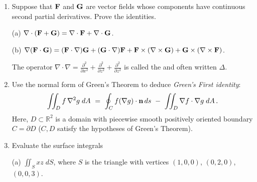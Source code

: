 \documentclass[12pt]{article}
\newcommand{\bfF}{{\bf F}}    %
\newcommand{\bfG}{{\bf G}}    %
\newcommand{\bfn}{{\bf n}}    %
\begin{document}
\begin{enumerate}
\item Suppose that $\bfF$ and $\bfG$ are vector fields whose components have continuous second partial derivatives.
  Prove the identities.

  (a) $\nabla\cdot(\bfF +\bfG) = \nabla\cdot\bfF + \nabla\cdot\bfG$.

  (b) $\nabla(\bfF\cdot\bfG) = (\bfF\cdot\nabla) \bfG + (\bfG\cdot\nabla) \bfF
  + \bfF\times (\nabla\times\bfG) + \bfG\times (\nabla\times\bfF)$.

  The operator $\nabla\cdot\nabla=\frac{\partial^2}{\partial x^2}+\frac{\partial^2}{\partial z^2}+\frac{\partial^2}{\partial z^2}$
  is called the {\color{blue}{\sl Laplacian}} and often written {\color{blue}$\Delta$}.
\vspace{-2pt}
   
\item Use the normal form of Green's Theorem to deduce {\sl Green's First identity}:
  \[
  \iint_D f\,\nabla^2 g\; dA\ =\ \oint_C f (\nabla g)\cdot \bfn \, ds\ -\ \iint_D \nabla f \cdot \nabla g\; dA\,.
  \]
  Here, $D\subset{\mathbb R}^2$ is a domain with piecewise smooth positively oriented boundary $C=\partial D$ ($C,D$ satisfy the
  hypotheses of Green's Theorem).
\vspace{-2pt}


\item Evaluate the surface integrals

  (a) ${\displaystyle \iint_S xz\;dS}$, where $S$ is the triangle with vertices $(1,0,0)$, $(0,2,0)$, $(0,0,3)$.


\end{enumerate}
\end{document}
